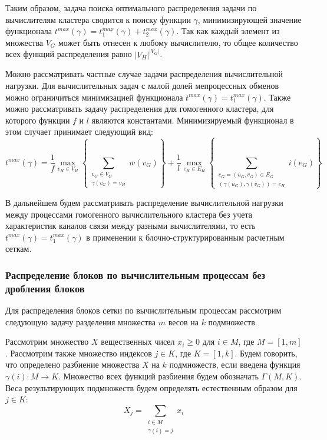 Таким образом, задача поиска оптимального распределения задачи по вычислителям кластера сводится к поиску функции $\gamma$, минимизирующей значение функционала $t^{max}(\gamma) = t_1^{max}(\gamma) + t_2^{max}(\gamma)$.
Так как каждый элемент из множества $V_G$ может быть отнесен к любому вычислителю, то общее количество всех функций распределения равно $|V_H|^{|V_G|}$.

Можно рассматривать частные случае задачи распределения вычислительной нагрузки.
Для вычислительных задач с малой долей мепроцессных обменов можно ограничиться минимизацией функционала $t^{max}(\gamma) = t_1^{max}(\gamma)$.
Также можно рассматривать задачу распределения для гомогенного кластера, для которого функции $f$ и $l$ являются константами.
Минимизируемый функционал в этом случает принимает следующий вид:
\begin{equation}
	t^{max}(\gamma) =
		\frac{1}{f} \max_{v_H \in V_H}{ \left\{ \sum_{\substack{v_G \in V_G \\ \gamma(v_G) = v_H}}{w(v_G)} \right\} } + 
		\frac{1}{l} \max_{e_H \in E_H}{ \left\{ \sum_{\substack{e_G = (u_G, v_G) \in E_G \\ (\gamma(u_G), \gamma(v_G)) = e_H}}{i(e_G)} \right\} }
\end{equation}

В дальнейшем будем рассматривать распределение вычислительной нагрузки между процессами гомогенного вычислительного кластера без учета характеристик каналов связи между разными вычислителями, то есть $t^{max}(\gamma) = t_1^{max}(\gamma)$ в применении к блочно-структурированным расчетным сеткам.

\subsubsection{Распределение блоков по вычислительным процессам без дробления блоков}

Для распределения блоков сетки по вычислительным процессам рассмотрим следующую задачу разделения множества $m$ весов на $k$ подмножеств.

Рассмотрим множество $X$ вещественных чисел $x_i \ge 0$ для $i \in M$, где $M = [1, m]$.
Рассмотрим также множество индексов $j \in K$, где $K = [1, k]$.
Будем говорить, что определено разбиение множества $X$ на $k$ подмножеств, если введена функция $\gamma(i): M \rightarrow K$.
Множество всех функций разбиения будем обозначать $\Gamma(M, K)$.
Веса результирующих подмножеств будем определять естественным образом для $j \in K$:
\begin{equation}
	X_j = \sum_{\substack{i \in M \\ \gamma(i) = j}}{x_i}
\end{equation}

